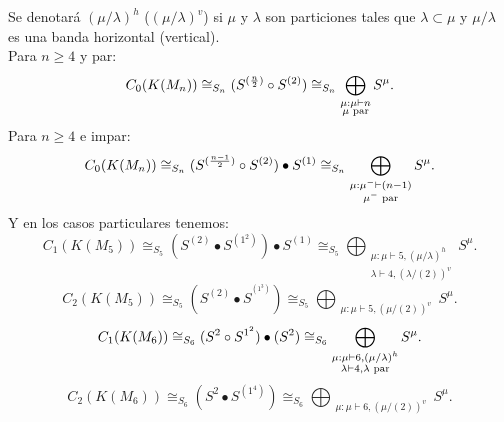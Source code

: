 \documentclass[12pt]{book}
\theoremstyle{definition}
\newcounter{in}
\begin{document}
Se denotará $(\mu / \lambda)^{h}$ ($(\mu / \lambda)^{v}$) si $\mu$ y
$\lambda$ son particiones tales que $\lambda \subset \mu$ y $\mu /
\lambda$ es una banda horizontal (vertical). \\
Para $n \geq 4$ y par:
\begin{equation}
C_{0}(K(M_{n})) \cong_{S_{n}} (S^{(\frac{n}{2})} \circ S^{(2)} ) \cong_{S_{n}} \bigoplus_{\substack{\mu:\mu\vdash n\\
      \mu \textup{ par}}} S^{\mu}.
\end{equation}
Para $n \geq 4$ e impar:
\begin{equation}
C_{0}(K(M_{n})) \cong_{S_{n}} (S^{(\frac{n-1}{2})} \circ S^{(2)} ) \bullet S^{(1)} \cong_{S_{n}} \bigoplus_{\substack{\mu:\mu^{-}\vdash (n-1)\\
      \mu^{-} \textup{ par}}} S^{\mu}.
\end{equation}
Y en los casos particulares tenemos:
\begin{equation}
C_{1}(K(M_{5})) \cong_{S_{5}} (S^{(2)} \bullet S^{(1^{2})}) \bullet S^{(1)} \cong_{S_{5}} \bigoplus_{\substack{\mu:\mu \vdash 5, (\mu / \lambda)^{h}\\
      \lambda \vdash 4, (\lambda / (2))^{v}}} S^{\mu}.
\end{equation}
\begin{equation}
C_{2}(K(M_{5})) \cong_{S_{5}} (S^{(2)} \bullet S^{^{(1^{3})}}) \cong_{S_{5}} \bigoplus_{\substack{\mu:\mu \vdash 5, (\mu / (2))^{v}}} S^{\mu}.
\end{equation}
\begin{equation}
C_{1}(K(M_{6})) \cong_{S_{6}} (S^{2}  \circ S^{1^{2}}) \bullet (S^{2}) \cong_{S_{6}} \bigoplus_{\substack{\mu:\mu \vdash 6, (\mu / \lambda)^{h}\\
      \lambda \vdash 4, \lambda \textup{ par}}} S^{\mu}.
\end{equation}
\begin{equation}
C_{2}(K(M_{6})) \cong_{S_{6}} (S^{2} \bullet S^{(1^{4})}) \cong_{S_{6}} \bigoplus_{\substack{\mu:\mu \vdash 6, (\mu / (2))^{v}}} S^{\mu}.
\end{equation}
\end{document}
